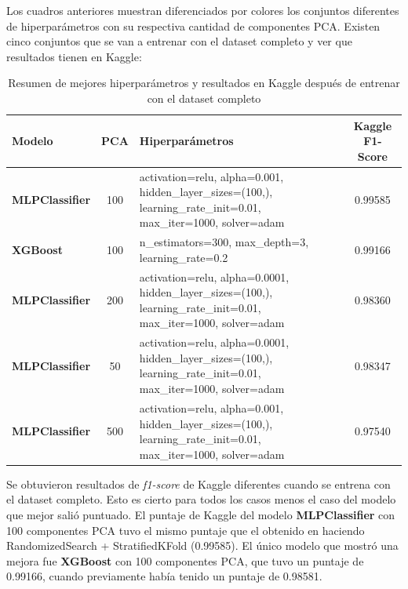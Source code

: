 \documentclass{article}
\begin{document}
Los cuadros anteriores muestran diferenciados por colores los conjuntos diferentes de hiperparámetros con su respectiva cantidad de componentes PCA. Existen cinco conjuntos que se van a entrenar con el dataset completo y ver que resultados tienen en Kaggle:

\begin{table}[H]
    \centering
    \begin{tabular}{|l|c|p{7cm}|c|}
    \hline
    \rowcolor{tableblue} \textbf{Modelo} & \textbf{PCA} & \textbf{Hiperparámetros} & \textbf{Kaggle F1-Score} \\
    \hline
    \rowcolor{blue!20} \textbf{MLPClassifier} & 100 & activation=relu, alpha=0.001, hidden\_layer\_sizes=(100,), learning\_rate\_init=0.01, max\_iter=1000, solver=adam & 0.99585 \\
    \hline
    \rowcolor{yellow!60} \textbf{XGBoost} & 100 & n\_estimators=300, max\_depth=3, learning\_rate=0.2 & 0.99166 \\
    \hline
    \rowcolor{purple!30} \textbf{MLPClassifier} & 200 & activation=relu, alpha=0.0001, hidden\_layer\_sizes=(100,), learning\_rate\_init=0.01, max\_iter=1000, solver=adam & 0.98360 \\
    \hline
    \rowcolor{orange!40} \textbf{MLPClassifier} & 50 & activation=relu, alpha=0.0001, hidden\_layer\_sizes=(100,), learning\_rate\_init=0.01, max\_iter=1000, solver=adam & 0.98347 \\
    \hline
    \rowcolor{green!20} \textbf{MLPClassifier} & 500 & activation=relu, alpha=0.001, hidden\_layer\_sizes=(100,), learning\_rate\_init=0.01, max\_iter=1000, solver=adam & 0.97540 \\
    \hline
    \end{tabular}
    \caption{Resumen de mejores hiperparámetros y resultados en Kaggle después de entrenar con el dataset completo}
    \label{tab:resumen_colores}
\end{table}

Se obtuvieron resultados de \textit{f1-score} de Kaggle diferentes cuando se entrena con el dataset completo. Esto es cierto para todos los casos menos el caso del modelo que mejor salió puntuado. El puntaje de Kaggle del modelo \textbf{MLPClassifier} con 100 componentes PCA tuvo el mismo puntaje que el obtenido en haciendo RandomizedSearch + StratifiedKFold (0.99585). El único modelo que mostró una mejora fue \textbf{XGBoost} con 100 componentes PCA, que tuvo un puntaje de 0.99166, cuando previamente había tenido un puntaje de 0.98581.\\
\end{document}
